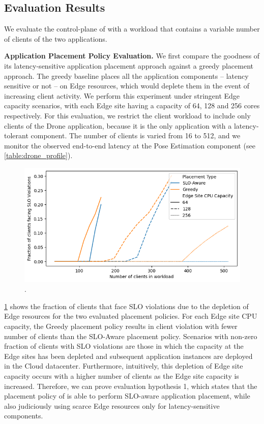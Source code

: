 \subsection{Evaluation Results}

We evaluate the control-plane of \oneedge{} with a workload that contains a variable number of clients of the two applications. 

\par \noindent \textbf{Application Placement Policy Evaluation. }We first compare the goodness of its latency-sensitive application placement approach against a greedy placement approach.  The greedy baseline places all the application components -- latency sensitive or not  -- on Edge resources, which would deplete them in the event of increasing client activity. We perform this experiment under stringent Edge capacity scenarios, with each Edge site having a capacity of 64, 128 and 256 cores respectively. For this evaluation, we restrict the client workload to include only clients of the Drone application, because it is the only application with a latency-tolerant component. The number of clients is varied from 16 to 512, and we monitor the observed end-to-end latency at the Pose Estimation component (see \cref{table:drone_profile}). 
\begin{figure}[ht]
  \centering
    \includegraphics[width=0.8\columnwidth]{figures/oneedge/violations_wrt_greedy_vs_num_clients.png}
    \caption{\todo{}.}
    \label{fig:oneedge_placement}
\end{figure}
\cref{fig:oneedge_placement} shows the fraction of clients that face SLO violations due to the depletion of Edge resources for the two evaluated placement policies. For each Edge site CPU capacity, the Greedy placement policy results in client violation with fewer number of clients than the SLO-Aware placement policy. Scenarios with non-zero fraction of clients with SLO violations are those in which the capacity at the Edge sites has been depleted and subsequent application instances are deployed in the Cloud datacenter. Furthermore, intuitively, this depletion of Edge site capacity occurs with a higher number of clients as the Edge site capacity is increased. Therefore, we can prove evaluation hypothesis 1, which states that the placement policy of \oneedge{} is able to perform SLO-aware application placement, while also judiciously using scarce Edge resources only for latency-sensitive components.\\

